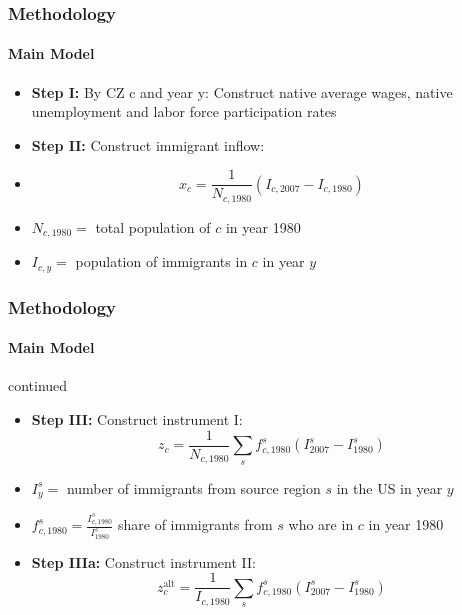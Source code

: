 \begin{frame}
    \frametitle{Methodology}
    \framesubtitle{Main Model}
    \begin{itemize}
        \item \textbf{Step I:} By CZ c and year y: Construct native average wages, native unemployment and labor force participation rates
    \end{itemize}
    \begin{itemize}
        \item \textbf{Step II:} Construct immigrant inflow: 
        \item \[x_c = \frac{1}{N_{c,1980}} \left(I_{c,2007} - I_{c,1980}\right)\]
    \end{itemize}
    \begin{itemize}
        \item $N_{c,1980} = $ total population of $c$ in year 1980
        \item $I_{c,y} = $ population of immigrants in $c$ in year $y$
    \end{itemize}
\end{frame}
\begin{frame}
    \frametitle{Methodology}
    \framesubtitle{Main Model} continued
    \begin{itemize}
        \item \textbf{Step III:} Construct instrument I:
        \[z_c = \frac{1}{N_{c,1980}} \sum_s f^s_{c,1980} \left(I^s_{2007} - I^s_{1980}\right)\]
    \end{itemize}
    \begin{itemize}
        \item $I^s_y = $ number of immigrants from source region $s$ in the US in year $y$
        \item $f^s_{c,1980} = \frac{I^s_{c,1980}}{I^s_{1980}}$ share of immigrants from $s$ who are in $c$ in year 1980
    \end{itemize}
    \begin{itemize}
        \item \textbf{Step IIIa:} Construct instrument II:
        \[z_c^{\text{alt}} = \frac{1}{I_{c,1980}} \sum_s f^s_{c,1980} \left(I^s_{2007} - I^s_{1980}\right)\]
    \end{itemize}
\end{frame}

